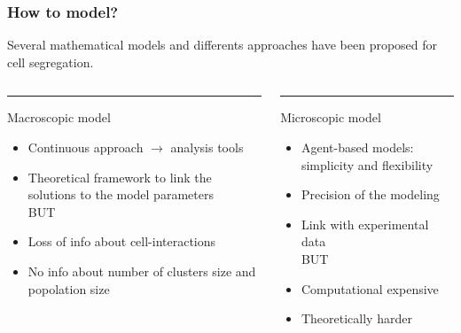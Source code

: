 \documentclass[10pt]{beamer}
\theoremstyle{remark}
\begin{document}
\begin{frame}
\frametitle{How to model?}
Several mathematical models and differents approaches have been proposed for cell segregation. 

\vspace{0.5cm}
\begin{columns}[T] %
	\begin{column}{.48\textwidth}
		\color{blue}\rule{\linewidth}{4pt}
			Macroscopic model	
		\begin{itemize}
			\item Continuous approach $\rightarrow$ analysis tools
			\item Theoretical framework to link the solutions to the model parameters \\
			\vspace{0.5cm}
			BUT
			\item Loss of info about cell-interactions
			\item No info about number of clusters size and popolation size
		\end{itemize}
		
		
	\end{column}%
	\hfill%
	\begin{column}{.48\textwidth}
		\color{blue}\rule{\linewidth}{4pt}
	Microscopic model	
\begin{itemize}
	\item Agent-based models: simplicity and flexibility
	\item Precision of the modeling
	\item Link with experimental data \\
	\vspace{0.5cm}
	BUT
	\item Computational expensive
	\item Theoretically harder
\end{itemize}
		
	\end{column}%
\end{columns}
\end{frame}
\end{document}
